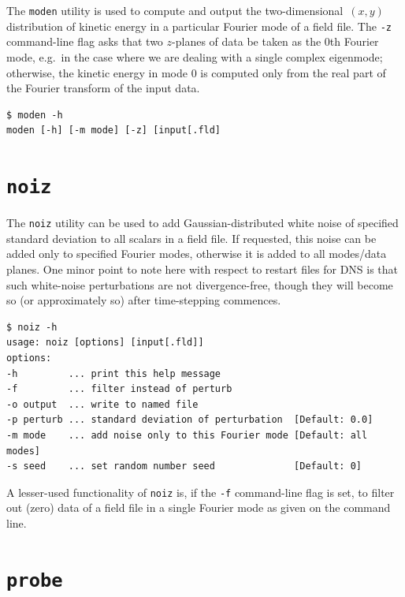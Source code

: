 \documentclass[11pt]{report}
\newcommand\twod{two-di\-men\-sion\-al}
\newcommand{\eg}{e.g.\ } \newcommand{\CC}{\mathrm{c.c.}}
\begin{document}
The \verb|moden| utility is used to compute and output the
\twod\ $(x,y)$ distribution of kinetic energy in a particular Fourier
mode of a field file.  The \verb|-z| command-line flag asks that two
$z$-planes of data be taken as the 0th Fourier mode, \eg in the case
where we are dealing with a single complex eigenmode; otherwise, the
kinetic energy in mode 0 is computed only from the real part of the
Fourier transform of the input data.
%
{\small
\begin{verbatim}
$ moden -h
moden [-h] [-m mode] [-z] [input[.fld]
\end{verbatim}
}

\section{\texttt{noiz}}
\label{sec.noiz}

The \verb|noiz| utility can be used to add Gaussian-distributed white
noise of specified standard deviation to all scalars in a field
file. If requested, this noise can be added only to specified Fourier
modes, otherwise it is added to all modes/data planes.  One minor
point to note here with respect to restart files for DNS is that such
white-noise perturbations are not divergence-free, though they will
become so (or approximately so) after time-stepping commences.
%
{\small
\begin{verbatim}
$ noiz -h
usage: noiz [options] [input[.fld]]
options:
-h         ... print this help message
-f         ... filter instead of perturb
-o output  ... write to named file
-p perturb ... standard deviation of perturbation  [Default: 0.0]
-m mode    ... add noise only to this Fourier mode [Default: all modes]
-s seed    ... set random number seed              [Default: 0]
\end{verbatim}
}
%
A lesser-used functionality of \verb|noiz| is, if the \verb|-f|
command-line flag is set, to filter out (zero) data of a field file in
a single Fourier mode as given on the command line.

\section{\texttt{probe}}
\label{sec.probe}
\end{document}
